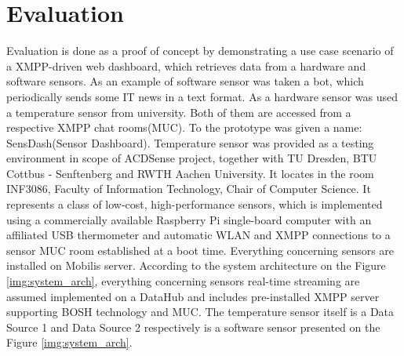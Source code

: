 \section{Evaluation}
Evaluation is done as a proof of concept by demonstrating a use case scenario of a XMPP-driven web dashboard, which retrieves data from a hardware and software sensors. As an example of software sensor was taken a bot, which periodically sends some IT news in a text format. As a hardware sensor was used a temperature sensor from university. Both of them are accessed from a respective XMPP chat rooms(MUC). To the prototype was given a name: SensDash(Sensor Dashboard). Temperature sensor was provided as a testing environment in scope of ACDSense project, together with TU Dresden, BTU Cottbus - Senftenberg and RWTH Aachen University. It locates in the room INF3086, Faculty of Information Technology, Chair of Computer Science. It represents a class of low-cost, high-performance sensors, which is implemented using a commercially available Raspberry Pi single-board computer with an affiliated USB thermometer and automatic WLAN and XMPP connections to a sensor MUC room established at a boot time. Everything concerning sensors are installed on Mobilis server. According to the system architecture on the Figure \ref{img:system_arch}, everything concerning sensors real-time streaming are assumed implemented on a DataHub and includes pre-installed XMPP server supporting BOSH technology and MUC. The temperature sensor itself is a Data Source 1 and Data Source 2 respectively is a software sensor  presented on the Figure \ref{img:system_arch}.

